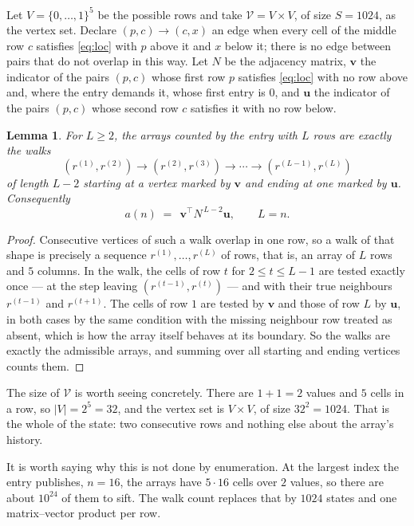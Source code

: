 \documentclass[11pt,a4paper]{article}
\theoremstyle{plain}
\newtheorem{lemma}[theorem]{Lemma}
\theoremstyle{definition}
\begin{document}
Let $V=\{0,\dots,1\}^{5}$ be the possible rows and take
$\mathcal V=V\times V$, of size $S=1024$, as the vertex set. Declare $(p,c)\to(c,x)$ an edge
when every cell of the middle row $c$ satisfies \eqref{eq:loc} with $p$ above it and $x$
below it; there is no edge between pairs that do not overlap in this way. Let $N$ be the
adjacency matrix, $\mathbf{v}$ the indicator of the pairs $(p,c)$ whose first row $p$
satisfies \eqref{eq:loc} with no row above and, where the entry demands it, whose first entry is $0$, and $\mathbf{u}$ the indicator of
the pairs $(p,c)$ whose second row $c$ satisfies it with no row below.

\begin{lemma}\label{lem:walk}
For $L\ge2$, the arrays counted by the entry with $L$ rows are exactly the walks
\[
(r^{(1)},r^{(2)})\to(r^{(2)},r^{(3)})\to\cdots\to(r^{(L-1)},r^{(L)})
\]
of length $L-2$ starting at a vertex marked by $\mathbf{v}$ and ending at one marked by
$\mathbf{u}$. Consequently
\[
a(n)\;=\;\,\mathbf{v}^{\!\top}N^{\,L-2}\mathbf{u},\qquad L=n .
\]
\end{lemma}

\begin{proof}
Consecutive vertices of such a walk overlap in one row, so a walk of that shape is
precisely a sequence $r^{(1)},\dots,r^{(L)}$ of rows, that is, an array of $L$ rows
and $5$ columns. In the walk, the cells of row $t$ for $2\le t\le L-1$ are tested
exactly once --- at the step leaving $(r^{(t-1)},r^{(t)})$ --- and with their true
neighbours $r^{(t-1)}$ and $r^{(t+1)}$. The cells of row $1$ are tested by
$\mathbf{v}$ and those of row $L$ by $\mathbf{u}$, in both cases by the same condition
with the missing neighbour row treated as absent, which is how the array itself behaves at
its boundary. So the walks are exactly the admissible arrays, and summing over all starting
and ending vertices counts them.
\end{proof}


The size of $\mathcal V$ is worth seeing concretely. There are $1+1=2$ values
and $5$ cells in a row, so $|V|=2^{5}=32$, and the vertex set is
$V\times V$, of size $32^2=1024$. That is the whole of the state: two consecutive
rows and nothing else about the array's history.

It is worth saying why this is not done by enumeration. At the largest index the entry
publishes, $n=16$, the arrays have $5\cdot16$ cells over
$2$ values, so there are about $10^{24}$ of them to sift. The
walk count replaces that by $1024$ states and one matrix--vector product per row.
\end{document}
